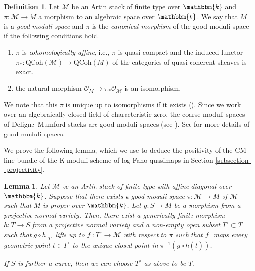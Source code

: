 \documentclass[12pt,twoside]{amsart}
\newtheorem{lem}[thm]{Lemma}
\theoremstyle{definition}
\newtheorem{defn}[thm]{Definition}
\begin{document}
\begin{defn}
Let $\mathcal{M}$ be an Artin stack of finite type over $\mathbbm{k}$ and $\pi\colon \mathcal{M}\to M$ a morphism to an algebraic space over $\mathbbm{k}$.
We say that $M$ is a {\em good moduli space} and $\pi$ is the {\em canonical morphism} of the good moduli space if the following conditions hold.
\begin{enumerate}
    \item $\pi$ is {\it cohomologically affine}, i.e., $\pi$ is quasi-compact and the induced functor $\pi_*\colon \mathrm{QCoh}(\mathcal{M})\to\mathrm{QCoh}(M)$ of the categories of quasi-coherent sheaves is exact.
    \item the natural morphism $\mathcal{O}_{M}\to\pi_*\mathcal{O}_{\mathcal{M}}$ is an isomorphism.
\end{enumerate}
We note that this $\pi$ is unique up to isomorphisms if it exists (\cite[Theorem 6.6]{alper}).
Since we work over an algebraically closed field of characteristic zero, the coarse moduli spaces of Deligne--Mumford stacks are good moduli spaces (see \cite[Definition 11.1.1]{Ols}).
See \cite{alper} for more details of good moduli spaces.
\end{defn}

We prove the following lemma, which we use to deduce the positivity of the CM line bundle of the K-moduli scheme of log Fano quasimaps in Section \ref{subsection--projectivity}.

\begin{lem}\label{lem--good-moduli-lift}
    Let $\mathcal{M}$ be an Artin stack of finite type with affine diagonal over $\mathbbm{k}$.
    Suppose that there exists a good moduli space $\pi\colon\mathcal{M}\to M$ of $\mathcal{M}$ such that $M$ is proper over $\mathbbm{k}$.
    Let $g\colon S\to M$ be a morphism from a projective normal variety.
    Then, there exist a generically finite morphism $h\colon T\to S$ from a projective normal variety and a non-empty open subset $T^\circ\subset T$ such that $g\circ h|_{T^\circ}$ lifts up to $f^\circ\colon T^\circ\to \mathcal{M}$ with respect to $\pi$ such that $f^\circ$ maps every geometric point $\bar{t}\in T^\circ$ to the unique closed point in $\pi^{-1}(g\circ h(\bar{t}))$. 

    If $S$ is further a curve, then we can choose $T^\circ$ as above to be $T$.
\end{lem}
\end{document}
